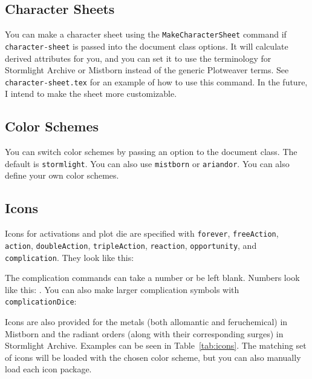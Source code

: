 \documentclass[article,stormlight,timeline,statblock]{plotweaver}
\begin{document}
\subsection{Character Sheets}
You can make a character sheet using the \texttt{MakeCharacterSheet} command if \texttt{character-sheet} is passed into the document class options. It will calculate derived attributes for you, and you can set it to use the terminology for Stormlight Archive or Mistborn instead of the generic Plotweaver terms. See \texttt{character-sheet.tex} for an example of how to use this command. In the future, I intend to make the sheet more customizable.

\subsection{Color Schemes}
You can switch color schemes by passing an option to the document class. The default is \texttt{stormlight}. You can also use \texttt{mistborn} or \texttt{ariandor}. You can also define your own color schemes.

\subsection{Icons}
Icons for activations and plot die are specified with \texttt{forever}, \texttt{freeAction}, \texttt{action}, \texttt{doubleAction}, 
\texttt{tripleAction}, \texttt{reaction}, \texttt{opportunity}, and \texttt{complication}. They look like this:
\begin{center}
    \forever \freeAction \action \doubleAction \tripleAction \reaction \opportunity \complication
\end{center}
The complication commands can take a number or be left blank. Numbers look like this: \complication[2]. You can also make larger complication symbols with \texttt{complicationDice}:
\begin{center}
    \complicationDice\space \complicationDice[2] \complicationDice[4]
\end{center}

Icons are also provided for the metals (both allomantic and feruchemical) in Mistborn and the radiant orders (along with their corresponding surges) in Stormlight Archive. Examples can be seen in Table~\ref{tab:icons}. The matching set of icons will be loaded with the chosen color scheme, but you can also manually load each icon package.
\end{document}
